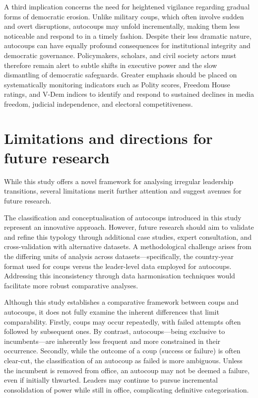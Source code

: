 \documentclass[
  12pt,
]{report}
\begin{document}
A third implication concerns the need for heightened vigilance regarding
gradual forms of democratic erosion. Unlike military coups, which often
involve sudden and overt disruptions, autocoups may unfold
incrementally, making them less noticeable and respond to in a timely
fashion. Despite their less dramatic nature, autocoups can have equally
profound consequences for institutional integrity and democratic
governance. Policymakers, scholars, and civil society actors must
therefore remain alert to subtle shifts in executive power and the slow
dismantling of democratic safeguards. Greater emphasis should be placed
on systematically monitoring indicators such as Polity scores, Freedom
House ratings, and V-Dem indices to identify and respond to sustained
declines in media freedom, judicial independence, and electoral
competitiveness.

\section{Limitations and directions for future
research}\label{limitations-and-directions-for-future-research}

While this study offers a novel framework for analysing irregular
leadership transitions, several limitations merit further attention and
suggest avenues for future research.

The classification and conceptualisation of autocoups introduced in this
study represent an innovative approach. However, future research should
aim to validate and refine this typology through additional case
studies, expert consultation, and cross-validation with alternative
datasets. A methodological challenge arises from the differing units of
analysis across datasets---specifically, the country-year format used
for coups versus the leader-level data employed for autocoups.
Addressing this inconsistency through data harmonisation techniques
would facilitate more robust comparative analyses.

Although this study establishes a comparative framework between coups
and autocoups, it does not fully examine the inherent differences that
limit comparability. Firstly, coups may occur repeatedly, with failed
attempts often followed by subsequent ones. By contrast,
autocoups---being exclusive to incumbents---are inherently less frequent
and more constrained in their occurrence. Secondly, while the outcome of
a coup (success or failure) is often clear-cut, the classification of an
autocoup as failed is more ambiguous. Unless the incumbent is removed
from office, an autocoup may not be deemed a failure, even if initially
thwarted. Leaders may continue to pursue incremental consolidation of
power while still in office, complicating definitive categorisation.
\end{document}
